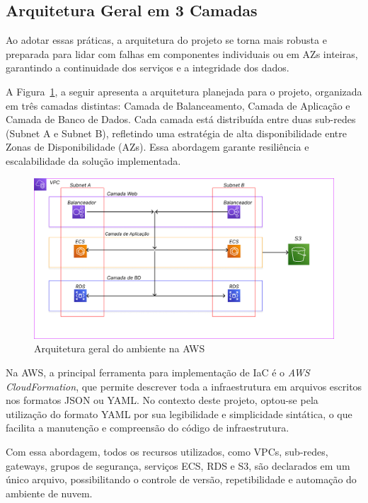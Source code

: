 \subsection{Arquitetura Geral em 3 Camadas}\label{sec:metod-fig-geral}
Ao adotar essas práticas, a arquitetura do projeto se torna mais robusta e preparada para lidar com falhas em componentes individuais ou em AZs inteiras, garantindo a continuidade dos serviços e a integridade dos dados.

A Figura~\ref{fig:arquitetura-geral}, a seguir apresenta a arquitetura planejada para o projeto, organizada em três camadas distintas: Camada de Balanceamento, Camada de Aplicação e Camada de Banco de Dados. Cada camada está distribuída entre duas sub-redes (Subnet A e Subnet B), refletindo uma estratégia de alta disponibilidade entre Zonas de Disponibilidade (AZs). Essa abordagem garante resiliência e escalabilidade da solução implementada.

\begin{figure}[H]
\centering
\caption{Arquitetura geral do ambiente na AWS}
\label{fig:arquitetura-geral}
\includegraphics[scale=0.4]{imagens/arquitetura.png}
\end{figure}


Na AWS, a principal ferramenta para implementação de IaC é o \textit{AWS CloudFormation}, que permite descrever toda a infraestrutura em arquivos escritos nos formatos JSON ou YAML. No contexto deste projeto, optou-se pela utilização do formato YAML por sua legibilidade e simplicidade sintática, o que facilita a manutenção e compreensão do código de infraestrutura.\cite{aws2024cloudformation}

Com essa abordagem, todos os recursos utilizados, como VPCs, sub-redes, gateways, grupos de segurança, serviços ECS, RDS e S3, são declarados em um único arquivo, possibilitando o controle de versão, repetibilidade e automação do ambiente de nuvem.


